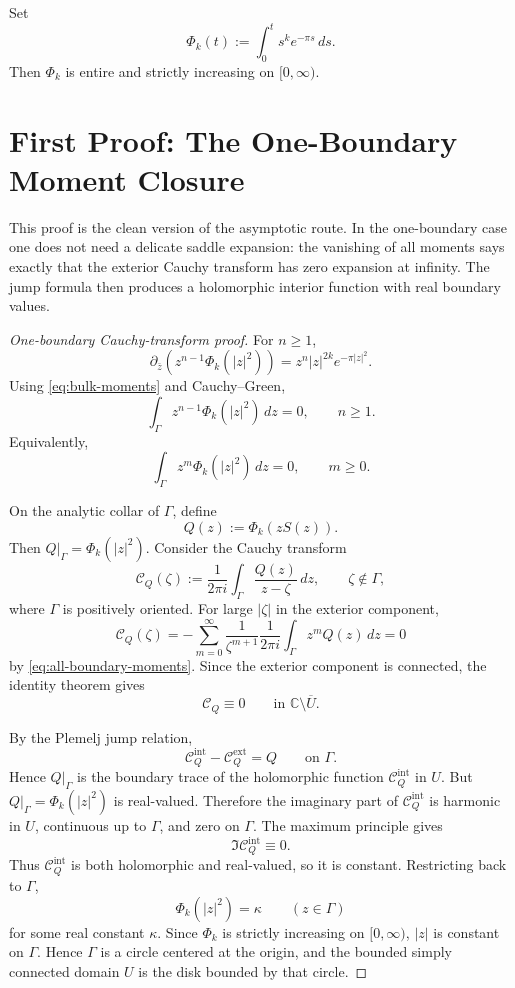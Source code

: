 \documentclass[11pt]{article}
\newcommand{\C}{\mathbb C}
\newcommand{\1}{\mathbf 1}
\newcommand{\dd}{\,d}
\newcommand{\pbar}{\partial_{\bar z}}
\newcommand{\calC}{\mathcal C}
\begin{document}
Set
\begin{equation}\label{eq:Phi-def}
  \Phi_k(t):=\int_0^t s^k e^{-\pi s}\dd s .
\end{equation}
Then \(\Phi_k\) is entire and strictly increasing on \([0,\infty)\).

\section{First Proof: The One-Boundary Moment Closure}

This proof is the clean version of the asymptotic route.  In the one-boundary
case one does not need a delicate saddle expansion: the vanishing of all
moments says exactly that the exterior Cauchy transform has zero expansion at
infinity.  The jump formula then produces a holomorphic interior function with
real boundary values.

\begin{proof}[One-boundary Cauchy-transform proof]
For \(n\ge1\),
\[
  \pbar\!\left(z^{n-1}\Phi_k(|z|^2)\right)
  =
  z^n |z|^{2k}e^{-\pi |z|^2}.
\]
Using \eqref{eq:bulk-moments} and Cauchy--Green,
\begin{equation}\label{eq:boundary-moments}
  \int_\Gamma z^{n-1}\Phi_k(|z|^2)\dd z=0,
  \qquad n\ge1.
\end{equation}
Equivalently,
\begin{equation}\label{eq:all-boundary-moments}
  \int_\Gamma z^m\Phi_k(|z|^2)\dd z=0,
  \qquad m\ge0.
\end{equation}

On the analytic collar of \(\Gamma\), define
\[
  Q(z):=\Phi_k(zS(z)).
\]
Then \(Q|_\Gamma=\Phi_k(|z|^2)\).  Consider the Cauchy transform
\[
  \calC_Q(\zeta):=\frac{1}{2\pi i}\int_\Gamma
  \frac{Q(z)}{z-\zeta}\dd z ,
  \qquad \zeta\notin\Gamma,
\]
where \(\Gamma\) is positively oriented.  For large \(|\zeta|\) in the exterior
component,
\[
  \calC_Q(\zeta)
  =
  -\sum_{m=0}^{\infty}
  \frac{1}{\zeta^{m+1}}
  \frac{1}{2\pi i}\int_\Gamma z^m Q(z)\dd z
  =0
\]
by \eqref{eq:all-boundary-moments}.  Since the exterior component is connected,
the identity theorem gives
\[
  \calC_Q\equiv0
  \qquad\text{in }\C\setminus\overline U .
\]

By the Plemelj jump relation,
\[
  \calC_Q^{\mathrm{int}}-\calC_Q^{\mathrm{ext}}=Q
  \qquad\text{on }\Gamma .
\]
Hence \(Q|_\Gamma\) is the boundary trace of the holomorphic function
\(\calC_Q^{\mathrm{int}}\) in \(U\).  But \(Q|_\Gamma=\Phi_k(|z|^2)\) is real-valued.
Therefore the imaginary part of \(\calC_Q^{\mathrm{int}}\) is harmonic in \(U\),
continuous up to \(\Gamma\), and zero on \(\Gamma\).  The maximum principle gives
\[
  \Im \calC_Q^{\mathrm{int}}\equiv0.
\]
Thus \(\calC_Q^{\mathrm{int}}\) is both holomorphic and real-valued, so it is
constant.  Restricting back to \(\Gamma\),
\[
  \Phi_k(|z|^2)=\kappa
  \qquad(z\in\Gamma)
\]
for some real constant \(\kappa\).  Since \(\Phi_k\) is strictly increasing on
\([0,\infty)\), \(|z|\) is constant on \(\Gamma\).  Hence \(\Gamma\) is a circle
centered at the origin, and the bounded simply connected domain \(U\) is the disk
bounded by that circle.
\end{proof}
\end{document}
